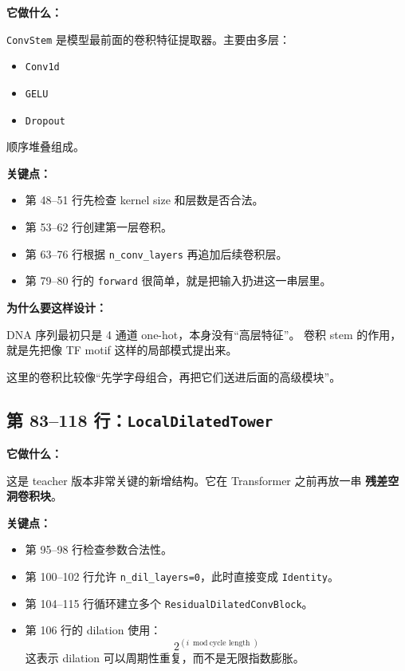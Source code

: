 \documentclass[11pt,a4paper]{ctexart}
\begin{document}
\textbf{它做什么：}

\texttt{ConvStem} 是模型最前面的卷积特征提取器。主要由多层：

\begin{itemize}[leftmargin=2em]
\item \texttt{Conv1d}
\item \texttt{GELU}
\item \texttt{Dropout}
\end{itemize}

顺序堆叠组成。

\textbf{关键点：}

\begin{itemize}[leftmargin=2em]
\item 第 48--51 行先检查 kernel size 和层数是否合法。
\item 第 53--62 行创建第一层卷积。
\item 第 63--76 行根据 \texttt{n\_conv\_layers} 再追加后续卷积层。
\item 第 79--80 行的 \texttt{forward} 很简单，就是把输入扔进这一串层里。
\end{itemize}

\textbf{为什么要这样设计：}

DNA 序列最初只是 4 通道 one-hot，本身没有“高层特征”。
卷积 stem 的作用，就是先把像 TF motif 这样的局部模式提出来。

这里的卷积比较像“先学字母组合，再把它们送进后面的高级模块”。

\subsection{第 83--118 行：\texttt{LocalDilatedTower}}

\textbf{它做什么：}

这是 teacher 版本非常关键的新增结构。它在 Transformer 之前再放一串
\textbf{残差空洞卷积块}。

\textbf{关键点：}

\begin{itemize}[leftmargin=2em]
\item 第 95--98 行检查参数合法性。
\item 第 100--102 行允许 \texttt{n\_dil\_layers=0}，此时直接变成 \texttt{Identity}。
\item 第 104--115 行循环建立多个 \texttt{ResidualDilatedConvBlock}。
\item 第 106 行的 dilation 使用：
\[
2^{(i \bmod \text{cycle length})}
\]
这表示 dilation 可以周期性重复，而不是无限指数膨胀。
\end{itemize}
\end{document}
